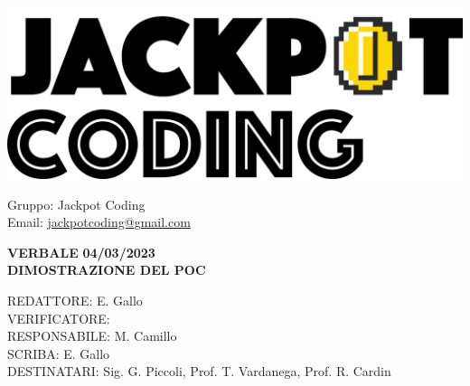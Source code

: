 \documentclass[5pt]{article}
\begin{document}
\begin{minipage}[t]{0.50\textwidth}
    \begin{flushleft}
        \hspace{10pt}
        \includegraphics[scale=0.65]{jackpot-logo.png} 
    \end{flushleft}
\end{minipage}
\hspace{-60pt} %
\begin{flushright}
    \begin{minipage}[t]{0.50\textwidth}
        \begin{flushright}
            Gruppo: {\Large Jackpot Coding}\\
            Email: \href{mailto:jackpotcoding@gmail.com}{jackpotcoding@gmail.com}
        \end{flushright}
    \end{minipage}
\end{flushright}

\vspace{20pt}

\begin{center}
    \textbf{\large VERBALE }
    \textbf{\large 04/03/2023} \\
    \textbf{\LARGE DIMOSTRAZIONE DEL POC}
\end{center}

\vspace{13pt}

\begin{flushleft}
    \begin{spacing}{1.5}
        REDATTORE: E. Gallo\\ 
        VERIFICATORE: \\ 
        RESPONSABILE: M. Camillo\\ 
        \vspace{7pt}
        SCRIBA: E. Gallo\\ 
        \vspace{7pt}
        DESTINATARI: Sig. G. Piccoli, Prof. T. Vardanega, Prof. R. Cardin\\ 
    \end{spacing}
\end{flushleft}
\end{document}
